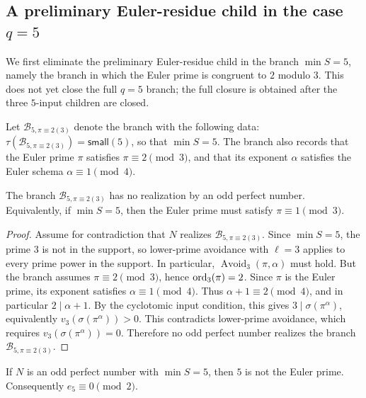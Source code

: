 \subsection{A preliminary Euler-residue child in the case $q=5$}

We first eliminate the preliminary Euler-residue child in the branch
\(\min S=5\), namely the branch in which the Euler prime is congruent to
\(2\) modulo \(3\).
This does not yet close the full \(q=5\) branch; the full closure is obtained
after the three \(5\)-input children are closed.

\begin{definition}[The bad Euler branch in the case $\min S=5$]
Let $\mathcal B_{5,\pi\equiv 2(3)}$ denote the branch with the following data:
\(\tau(\mathcal B_{5,\pi\equiv 2(3)})=\mathsf{small}(5)\), so that
\(\min S=5\).  The branch also records that the Euler prime \(\pi\) satisfies
\(\pi\equiv2\pmod3\), and that its exponent \(\alpha\) satisfies the Euler
schema \(\alpha\equiv1\pmod4\).
\end{definition}

\begin{proposition}[Closed $q=5$ branch: Euler prime $2$ modulo $3$]
\label{prop:q5-euler-2mod3-empty}
The branch \(\mathcal B_{5,\pi\equiv 2(3)}\) has no realization by an odd
perfect number.  Equivalently, if \(\min S=5\), then the Euler prime must
satisfy \(\pi\equiv1\pmod3\).
\end{proposition}

\begin{proof}
Assume for contradiction that \(N\) realizes
\(\mathcal B_{5,\pi\equiv 2(3)}\).  Since \(\min S=5\), the prime \(3\) is
not in the support, so lower-prime avoidance with \(\ell=3\) applies to every
prime power in the support.  In particular,
\(\operatorname{Avoid}_3(\pi,\alpha)\) must hold.  But the branch assumes
\(\pi\equiv2\pmod3\), hence \(\operatorname{ord}_3(\pi)=2\).  Since \(\pi\) is the Euler
prime, its exponent satisfies \(\alpha\equiv1\pmod4\).  Thus
\(\alpha+1\equiv2\pmod4\), and in particular \(2\mid\alpha+1\).  By the
cyclotomic input condition, this gives \(3\mid\sigma(\pi^\alpha)\), equivalently
\(v_3(\sigma(\pi^\alpha))>0\).  This contradicts lower-prime avoidance, which
requires \(v_3(\sigma(\pi^\alpha))=0\).
Therefore no odd perfect number realizes the branch
$\mathcal B_{5,\pi\equiv 2(3)}$.
\end{proof}

\begin{corollary}
\label{cor:q5-minimal-prime-non-euler}
If \(N\) is an odd perfect number with \(\min S=5\), then \(5\) is not the
Euler prime.  Consequently \(e_5\equiv0\pmod2\).
\end{corollary}

